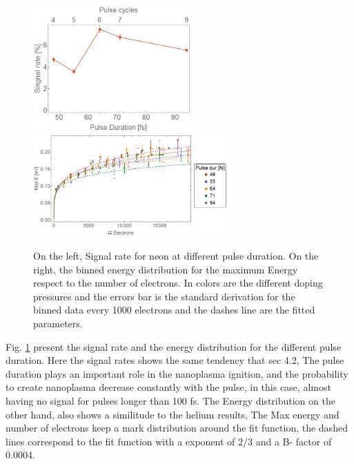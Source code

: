 \begin{figure}[htb]
\centering

\hspace*{\fill}
{ \includegraphics[width=6cm]{../Images/results/MIR_Ne_pulseduration/SigRate.png}} \hfill {\includegraphics[width=7.4cm]{../Images/results/MIR_Ne_pulseduration/binned.png}}
\hspace*{\fill}
\caption[MIR Ne Pulse duration scan. Signal rate and Energy distribution]{On the left, Signal rate for neon at different pulse duration. On the right, the binned energy distribution for the maximum Energy respect to the number of electrons. In colors are the different doping pressures and the errors bar is the standard derivation for the binned data every 1000 electrons and the dashes line are the fitted parameters.}
\label{fig:Neonsigratepulse}
\end{figure}


Fig. \ref{fig:Neonsigratepulse} present the signal rate and the energy distribution for the different pulse duration. Here the signal rates shows the same tendency that sec 4.2, The pulse duration plays an important role in the nanoplasma ignition, and the probability to create nanoplasma decrease constantly with the pulse, in this case, almost having no signal for pulses longer than 100 fs. The Energy distribution on the other hand, also shows a similitude to the helium results, The Max energy and number of electrons keep a mark distribution around the fit function, the dashed lines correspond to the fit function with a exponent of 2/3 and a B- factor of 0.0004.





